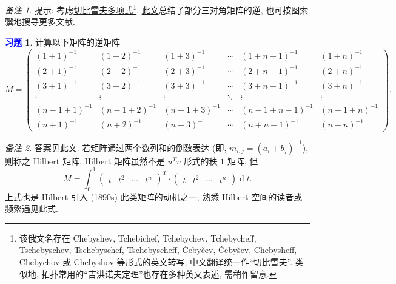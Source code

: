 \documentclass[11pt]{ctexart}
\theoremstyle{definition}
\numberwithin{equation}{section}
\theoremstyle{definition}
\newtheorem{exercise}{\textcolor{blue}{习题}}
\theoremstyle{remark}
\newtheorem*{remark}{备注}
\begin{document}
\begin{remark}
    提示: 考虑\href{https://en.wikipedia.org/wiki/Chebyshev_polynomials}{切比雪夫多项式}\footnote{该俄文名存在 Chebyshev, Tchebichef, Tchebychev, Tchebycheff, Tschebyschev, Tschebyschef, Tschebyscheff, Čebyčev, Čebyšev, Chebysheff, Chebychov 或 Chebyshov 等形式的英文转写; 中文翻译统一作``切比雪夫''. 类似地, 拓扑常用的``吉洪诺夫定理''也存在多种英文表述, 需稍作留意.}. \href{www.sciencedirect.com/science/article/pii/S0024379500002895}{此文}总结了部分三对角矩阵的逆, 也可按图索骥地搜寻更多文献. 
\end{remark}

\begin{exercise}
    计算以下矩阵的逆矩阵
    \begin{equation}
        M =\begin{pmatrix}
            ( 1+1)^{-1} & ( 1+2)^{-1} & ( 1+3)^{-1} & \cdots  & ( 1+n-1)^{-1} & ( 1+n)^{-1}\\
            ( 2+1)^{-1} & ( 2+2)^{-1} & ( 2+3)^{-1} & \cdots  & ( 2+n-1)^{-1} & ( 2+n)^{-1}\\
            ( 3+1)^{-1} & ( 3+2)^{-1} & ( 3+3)^{-1} & \cdots  & ( 3+n-1)^{-1} & ( 3+n)^{-1}\\
            \vdots  & \vdots  & \vdots  & \ddots  & \vdots  & \vdots \\
            ( n-1+1)^{-1} & ( n-1+2)^{-1} & ( n-1+3)^{-1} & \cdots  & ( n-1+n-1)^{-1} & ( n-1+n)^{-1}\\
            ( n+1)^{-1} & ( n+2)^{-1} & ( n+3)^{-1} & \cdots  & ( n+n-1)^{-1} & ( n+n)^{-1}
            \end{pmatrix}.
    \end{equation}
\end{exercise}

\begin{remark}
    答案见\href{http://proofwiki.org/wiki/Inverse_of_Hilbert_Matrix}{此文}. 若矩阵通过两个数列和的倒数表达 (即, $m_{i,j}=(a_i+b_j)^{-1}$), 则称之 Hilbert 矩阵. Hilbert 矩阵虽然不是 $u^Tv$ 形式的秩 $1$ 矩阵, 但
    \begin{equation}
        M=\int_{0}^{1} \begin{pmatrix}t&t^2&\cdots &t^n\end{pmatrix}^T \cdot \begin{pmatrix}t&t^2&\cdots &t^n\end{pmatrix}\operatorname dt. 
    \end{equation}
    上式也是 Hilbert 引入 (1890s) 此类矩阵的动机之一; 熟悉 Hilbert 空间的读者或频繁遇见此式. 
\end{remark}
\end{document}
